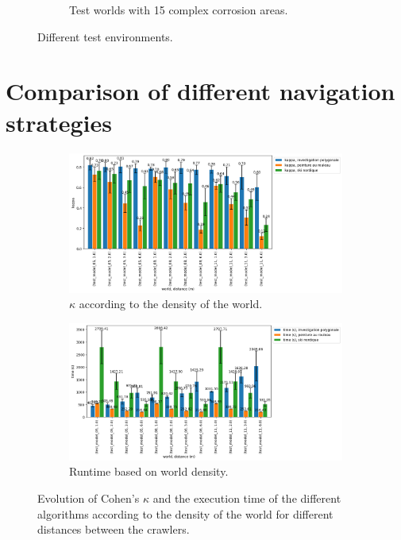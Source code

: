 \documentclass[english,RandD]{rapportPFE}  %
\begin{document}
\begin{figure}[H]
\begin{subfigure}[t]{0.15\linewidth}
				\caption{Test worlds with 15 complex corrosion areas.}
				\label{fig:test_model_15_complex_1}
			\end{subfigure}
			\caption{Different test environments.}
			\label{fig:test_models}
		\end{figure}
	\section{Comparison of different navigation strategies}
		\label{annexe:comparaison}
		\begin{figure}[H]
			\begin{subfigure}[t]{0.9\linewidth}
				\includegraphics[width=\linewidth]{graphics/investigation_polygonale-peinture_au_rouleau_ski_nordique-kappa_for_each_d_vs_investigation_polygonale-kappa_for_each_d.png}
				\caption{$\kappa$ according to the density of the world.}
				\label{fig:investigation_polygonale-peinture_au_rouleau_ski_nordique-kappa_for_each_d_vs_investigation_polygonale-kappa_for_each_d}
			\end{subfigure}
			\hfill
			\begin{subfigure}[t]{0.9\linewidth}
				\includegraphics[width=\linewidth]{graphics/investigation_polygonale-peinture_au_rouleau_ski_nordique-time_for_each_d_vs_investigation_polygonale-time_for_each_d.png}
				\caption{Runtime based on world density.}
				\label{fig:investigation_polygonale-peinture_au_rouleau_ski_nordique-time_for_each_d_vs_investigation_polygonale-time_for_each_d}
			\end{subfigure}
			\caption{Evolution of Cohen's $\kappa$ and the execution time of the different algorithms according to the density of the world for different distances between the crawlers.}
			\label{fig:investigation_polygonale-peinture_au_rouleau_ski_nordique_for_each_d}
		\end{figure}
\end{document}
